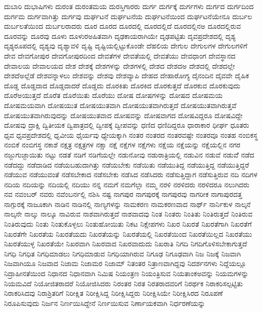 {ದುಬಾರಿ
ದುಭಾಷಿಗಳು
ದುರಂತ
ದುರಂತಮಯ
ದುರಸ್ತಿಗಾರರು
ದುರ್ಗ
ದುರ್ಗಕ್ಕೆ
ದುರ್ಗಗಳು
ದುರ್ಗದ
ದುರ್ಗದಿಂದ
ದುರ್ಗಮ
ದುರ್ಗವಾಗಿತ್ತು
ದುರ್ಗವು
ದುರ್ಘಟನೆ
ದುರ್ಘಟನೆಯ
ದುರ್ಘಟನೆಯಿಂದ
ದುರ್ಘಟನೆಯೇನೂ
ದುರ್ಬಲ
ದುರ್ಬಲತೆಯಿಂದ
ದುರ್ಬಲರಾದರು
ದೂರ
ದೂರದ
ದೂರದಲ್ಲಿ
ದೂರದಲ್ಲಿದೆ
ದೂರದಲ್ಲಿನಅ
ದೂರದಲ್ಲಿರುವ
ದೂರವನ್ನು
ದೂರವು
ದೂಳು
ದೂಳುರಅಹಿತವಾಗಿ
ದೃಢಕಾಯರಾಗಿಯೇ
ದೃಢಪಟ್ಟಿತು
ದೃವಪ್ರದೇಶದಲ್ಲಿ
ದೃಶ್ಯ
ದೃಶ್ಯರೂಪದಲ್ಲಿ
ದೃಶ್ಯವು
ದೃಶ್ಯಾವಳಿ
ದೃಷ್ಟಿ
ದೃಷ್ಟಿಯಲ್ಲಿಟ್ಟುಕೊಂಡೇ
ದೆಹಲಿಯ
ದೇಗುಲ
ದೇಗುಲಗಳ
ದೇಗುಲಗಳಿಗೆ
ದೇವ
ದೇವಗೋಪುರ
ದೇವಗೋಪುರದಿಂದ
ದೇವತೆಗಳ
ದೇವತೆಯಲ್ಲಿ
ದೇವತೆಯು
ದೇವಧಾಂಗ
ದೇವಸ್ಥಾನದ
ದೇವಾಲಯ
ದೇವಾಲಯದ
ದೇಶ
ದೇಶಕ್ಕೆ
ದೇಶಗಳನ್ನು
ದೇಶಗಳಲ್ಲಿ
ದೇಶದ
ದೇಶದಅ
ದೇಶದಲ್ಲಿ
ದೇಶದಲ್ಲೇ
ದೇಶದೆಅಲ್ಲೆಡೆ
ದೇಶವನ್ನಾಳಲು
ದೇಶವನ್ನು
ದೇಶವು
ದೇಶವ್ಯಾಪಿ
ದೇಹದ
ದೇಹಾರೋಗ್ಯ
ದೈನಂದಿನ
ದೈವವೇ
ದೈಹಿಕ
ದೊಡ್ಡ
ದೊಡ್ಡದಾದ
ದೊಡ್ಡದಾದರೆ
ದೊಡ್ಡದು
ದೊರಕಿತು
ದೊರಕಿದ
ದೊರಕುತ್ತದೆ
ದೊರಕುವ
ದೊರಕುವುದು
ದೊರೆಅಯುತ್ತದೆ
ದೊರೆತ
ದೊರೆಯಿತು
ದೊರೆಯು
ದೋಷ
ದೋಷಗಳನ್ನು
ದೋಷದ
ದೋಷಮಯ
ದೋಷಮಯವಾಗಿ
ದೋಷಯುತ
ದೋಷಯುತವಾಗಿ
ದೋಷಯುತವಾಗಿರುತ್ತದೆ
ದೋಷಯುತವಾಗಿರುತ್ತವೆ
ದೋಷಯುತವಾಗಿರುವುದನ್ನು
ದೋಷಯುತವಾದ
ದೋಷವನ್ನು
ದೋಷವಾಗದ
ದೋಷವಿದ್ದರೂ
ದೋಷವಿದ್ದೇ
ದೋಷವು
ದ್ರಾಕ್ಷಿ
ದ್ವಿತೀಯಕ
ದ್ವಿಪಾತ್ರದಲ್ಲಿ
ದ್ವೀಪಕ್ಕೆ
ದ್ವೀಪವನ್ನು
ಧಣಿದ
ಧಣಿದಿದ್ದರೂ
ಧಾರಾಕಾರ
ಧೀರ್ಘ
ಧೂತರು
ಧೃವ
ಧೃವಪ್ರದೇಶದಲ್ಲಿ
ಧೃವೀಯ
ಧೈರ್ಯವು
ಧ್ಯೇಯಕ್ಕಾಗಿ
ನಂತರ
ನಂತರದ
ನಂತರವಷ್ಟೇ
ನಂತರವೂ
ನಂತಹ
ನಂಬಿಕಸ್ಥ
ನಂಬಿಕೆ
ನಂಬಿಗಸ್ಥ
ನಕಾಶೆ
ನಕ್ಷತ್ರ
ನಕ್ಷತ್ರಗಳ
ನಕ್ಷಾ
ನಕ್ಷೆ
ನಕ್ಷೆಗಳ
ನಕ್ಷೆಗಳು
ನಕ್ಷೆಯ
ನಕ್ಷೆಯನ್ನು
ನಕ್ಷೆಯಲ್ಲಿನ
ನಗರ
ನಜ್ಜುಗುಜ್ಜಾಯಿತು
ನಟ್ಟು
ನಡತೆ
ನಡಿಗೆ
ನಡಿಗೆಯಲ್ಲೇ
ನಡುನೋವು
ನಡುರಾತ್ರಿಯಲ್ಲಿ
ನಡುವಿನ
ನಡುವೆ
ನಡುವೆೆ
ನಡೆದ
ನಡೆದದ್ದು
ನಡೆದಾಡಿದ
ನಡೆಯಬಹುದಾಗಿತ್ತು
ನಡೆಯಬೇಕು
ನಡೆಯಿತು
ನಡೆಯುತಿದ್ದ
ನಡೆಯುತ್ತಿದ್ದ
ನಡೆಯುತ್ತಿದ್ದರೆ
ನಡೆಯುವ
ನಡೆಯುವಂತೆ
ನಡೆಸಬೇಕಾದ
ನಡೆಸಬೇಕು
ನಡೆಸಿದ
ನಡೆಸಿದರು
ನಡೆಸುತ್ತಿದ್ದಾಗ
ನಡೆಸುತ್ತಿರುವ
ನದಿ
ನದಿಗಳ
ನದಿಯ
ನದಿಯನ್ನು
ನದಿಯಲ್ಲಿ
ನದಿಯು
ನನ್ನ
ನಮಗೆ
ನಮಗೆಲ್ಲಾ
ನಮ್ಮ
ನರಳಿ
ನರಳಿದರು
ನರಳಿದರೂ
ನಲುಗಿದರು
ನವ
ನವಂಬರ್
ನವರು
ನವೆಂಬರ್ನಲ್ಲಿ
ನಶಿಸಿ
ನಷ್ಟ
ನಾಗಪುರ
ನಾಗಪುರಕ್ಕೆ
ನಾಗಪುರವು
ನಾಗರೀಕ
ನಾಗಾಪುರದತ್ತ
ನಾಗ್ಪುರಕ್ಕೆ
ನಾಜೂಕಾಗಿ
ನಾಡಿನ
ನಾಡಿನಲ್ಲಿ
ನಾಣ್ಯಗಳನ್ನು
ನಾಮಕರಣ
ನಾಮಕರಣವಾದ
ನಾರ್ಥ್
ನಾರ್ನಿಕುಳ
ನಾಲ್ಕನೆ
ನಾಲ್ಕನೇ
ನಾಲ್ಕು
ನಾಲ್ಕೂ
ನಾವಿರುವ
ನಾಶವಾಗಿರುತ್ತದೆ
ನಾಶವಾದವು
ನಿಂತ
ನಿಂತರು
ನಿಂತಿತು
ನಿಂತಿರುತ್ತದೆ
ನಿಂತಿರುವ
ನಿಂತಿರುವುದು
ನಿಂತು
ನಿಂತುಕೊಳ್ಳಲು
ನಿಂತುಹೋಯಿತು
ನಿಕಟ
ನಿಕ್ಷೇಪಗಳು
ನಿಖರ
ನಿಖರತೆ
ನಿಖರತೆಗಾಗಿ
ನಿಖರತೆಗೆ
ನಿಖರತೆಗೇ
ನಿಖರತೆಯ
ನಿಖರತೆಯದು
ನಿಖರತೆಯನ್ನು
ನಿಖರತೆಯಲ್ಲಿ
ನಿಖರತೆಯಿಂದ
ನಿಖರತೆಯಿಲ್ಲದ
ನಿಖರತೆಯು
ನಿಖರತೆಯುಳ್ಳ
ನಿಖರತೆಯೇ
ನಿಖರವಾಗಿ
ನಿಖರವಾದ
ನಿಖರವಾದುದು
ನಿಖರಾತಿ
ನಿಗದಿ
ನಿಗದಿಗೊಳಿಸಬೇಕಾಗುತ್ತದೆ
ನಿಗಧಿ
ನಿಗಧಿತ
ನಿಗಧಿಮಾಡಲು
ನಿಗಧಿಮಾಡುವ
ನಿಗಧಿಯಾಗಿರುವ
ನಿಗೂಢ
ನಿಗೂಢವಾಗಿ
ನಿಜ
ನಿಜಕ್ಕೆ
ನಿಜವಾಗಿ
ನಿಜವಾಗಿಯೂ
ನಿಜವಾದ
ನಿಜಾಮ
ನಿಜಾಮರ
ನಿಜಾಮ್
ನಿತಂತರ
ನಿತ್ರಾಣವಾಗಿದ್ದವು
ನಿದರ್ಶನಗಳು
ನಿದ್ದೆಯಲ್ಲೂ
ನಿದ್ರಾಹೀನತೆಯಿಂದ
ನಿಧಾನದ
ನಿಧಾನವಾಗಿ
ನಿಮಿಷ
ನಿಯಂತ್ರಣ
ನಿಯಂತ್ರಿಸುವ
ನಿಯತಾಂಕಅವನ್ನು
ನಿಯಮಗಳನ್ನು
ನಿಯಮವಿದೆ
ನಿಯೋಜಿತರಾದರೆ
ನಿಯೋಜಿಸಿದರು
ನಿರಂತರ
ನಿರತ
ನಿರತರಾದವರಿಗೆ
ನಿರರ್ಥಕ
ನಿರಾಕರಿಸಲ್ಪಟ್ಟಿತು
ನಿರಾಕರಿಸಿದವು
ನಿರಾಶ್ರಿತರಿಗೆ
ನಿರೀಕ್ಷಿತ
ನಿರೀಕ್ಷಿಸಿದ್ದ
ನಿರೀಕ್ಷಿಸಿದ್ದರು
ನಿರೀಕ್ಷಿಸಿಯೇ
ನಿರೀಕ್ಷಿಸಿರದ
ನಿರೂಪಣೆ
ನಿರೂಪಿಸುವುದು
ನಿರ್ಜನ
ನಿರ್ಣಯಿಸಿದ್ದೇನೆ
ನಿರ್ಣಯಿಸುವ
ನಿರ್ಣಾಯಕವಾಗಿ
ನಿರ್ಧರಣೆಯನ್ನು
}

